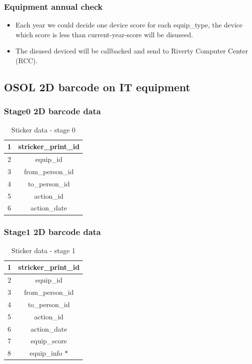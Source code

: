 \documentclass[a4paper,11pt]{article}
\begin{document}
\subsubsection{Equipment annual check}
	\begin{itemize}
		\item Each year we could decide one device score for each equip\_type, the device which score is less than current-year-score will be disuseed.
		\item The disused deviced will be callbacked and send to Riverty Computer Center (RCC).
	\end{itemize}
\subsection{OSOL 2D barcode on IT equipment}

\subsubsection {Stage0 2D barcode data}

\begin{table}[h!]
\begin{center}
	\begin{tabular}{ | c | c | }
		\hline
		1 & stricker\_print\_id \\ 
		\hline
		2 & equip\_id  \\  
		\hline
		3 & from\_person\_id \\
		\hline
		4 & to\_person\_id \\ 
		\hline
		5 &  action\_id \\  
		\hline
		6 & action\_date \\
		\hline
	\end{tabular}
	\caption{Sticker data \-- stage 0}
	\label{table:sticker_data_stage_0}
\end{center}
\end{table}


\subsubsection {Stage1 2D barcode data}

\begin{table}[h!]
	\begin{center}
		\begin{tabular}{ | c | c | }
			\hline
			1 & stricker\_print\_id \\ 
			\hline
			2 & equip\_id  \\  
			\hline
			3 & from\_person\_id \\
			\hline
			4 & to\_person\_id \\ 
			\hline
			5 &  action\_id \\  
			\hline
			6 & action\_date \\
			\hline
			7 &  equip\_score \\  
			\hline
			8 & equip\_info $*$ \\
			\hline
		\end{tabular}
		\caption{Sticker data \-- stage 1}
		\label{table:sticker_data_stage_1}
	\end{center}
\end{table}
\end{document}
